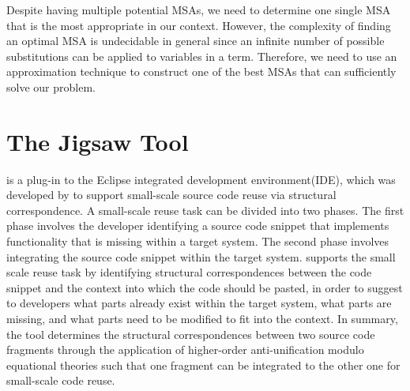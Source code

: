 Despite having multiple potential MSAs, we need to determine one single MSA that is the most appropriate in our context. However, the complexity of finding an optimal MSA is undecidable in general \cite{2008:fse:cottrell} since an infinite number of possible substitutions can be applied to variables in a term. Therefore, we need to use an approximation technique to construct one of the best MSAs that can sufficiently solve our problem.


\section{The Jigsaw Tool}\label{Jigsaw}



 is a plug-in to the Eclipse integrated development environment(IDE), which was developed by \citet{2008:fse:cottrell} to support small-scale source code reuse via structural correspondence. A small-scale reuse task can be divided into two phases. The first phase involves the developer identifying a source code snippet that implements functionality that is missing within a target system. The second phase involves integrating the source code snippet within the target system. 
 supports the small scale reuse task by identifying structural correspondences between the code snippet and the context into which the code should be pasted, in order to suggest to developers what parts already exist within the target system, what parts are missing, and what parts need to be modified to fit into the context. In summary, the  tool determines the structural correspondences between two  source code fragments through the application of higher-order anti-unification modulo equational theories such that one fragment can be integrated to the other one for small-scale code reuse. 


